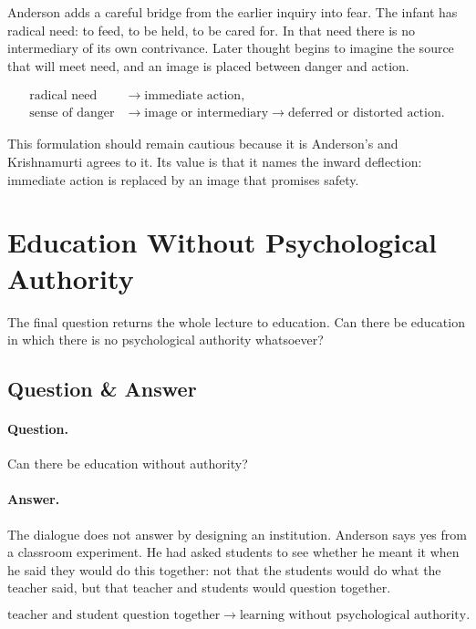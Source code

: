 \documentclass[11pt,oneside]{book}
\begin{document}
Anderson adds a careful bridge from the earlier inquiry into fear. The infant has radical need: to feed, to be held, to be cared for. In that need there is no intermediary of its own contrivance. Later thought begins to imagine the source that will meet need, and an image is placed between danger and action.

\begin{align}
\text{radical need}
&\longrightarrow
\text{immediate action},\\
\text{sense of danger}
&\longrightarrow
\text{image or intermediary}
\longrightarrow
\text{deferred or distorted action}.
\end{align}

This formulation should remain cautious because it is Anderson's and Krishnamurti agrees to it. Its value is that it names the inward deflection: immediate action is replaced by an image that promises safety.

\section{Education Without Psychological Authority}

The final question returns the whole lecture to education. Can there be education in which there is no psychological authority whatsoever?

\subsection{Question \& Answer}

\paragraph{Question.}
Can there be education without authority?

\paragraph{Answer.}
The dialogue does not answer by designing an institution. Anderson says yes from a classroom experiment. He had asked students to see whether he meant it when he said they would do this together: not that the students would do what the teacher said, but that teacher and students would question together.

\begin{equation}
\text{teacher and student question together}
\longrightarrow
\text{learning without psychological authority}.
\end{equation}
\end{document}
